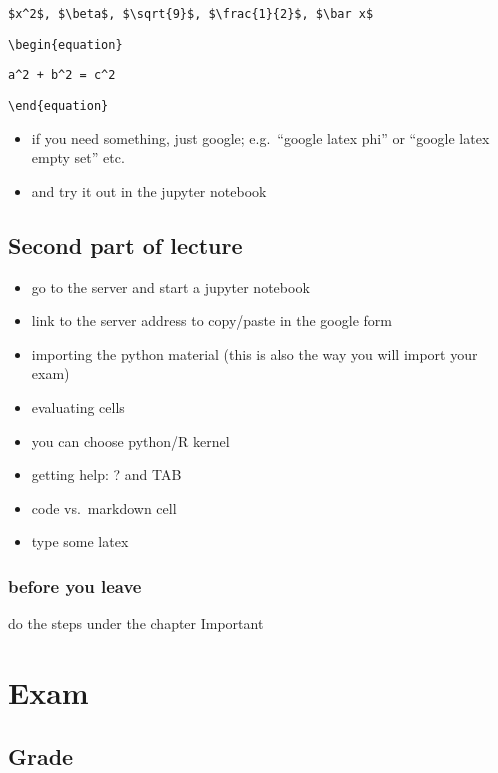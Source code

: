 \documentclass[]{book}
\providecommand{\tightlist}{%
  \setlength{\itemsep}{0pt}\setlength{\parskip}{0pt}}
\begin{document}
\texttt{\$x\^{}2\$,\ \$\textbackslash{}beta\$,\ \$\textbackslash{}sqrt\{9\}\$,\ \$\textbackslash{}frac\{1\}\{2\}\$,\ \$\textbackslash{}bar\ x\$}

\texttt{\textbackslash{}begin\{equation\}}

\texttt{a\^{}2\ +\ b\^{}2\ =\ c\^{}2}

\texttt{\textbackslash{}end\{equation\}}

\begin{itemize}
\tightlist
\item
  if you need something, just google; e.g.~``google latex phi'' or ``google latex empty set'' etc.
\item
  and try it out in the jupyter notebook
\end{itemize}

\hypertarget{second-part-of-lecture}{%
\section{Second part of lecture}\label{second-part-of-lecture}}

\begin{itemize}
\item
  go to the server and start a jupyter notebook
\item
  link to the server address to copy/paste in the google form
\item
  importing the python material (this is also the way you will import your exam)
\item
  evaluating cells
\item
  you can choose python/R kernel
\item
  getting help: ? and TAB
\item
  code vs.~markdown cell
\item
  type some latex
\end{itemize}

\hypertarget{before-you-leave}{%
\subsection{before you leave}\label{before-you-leave}}

do the steps under the chapter Important

\hypertarget{exam-1}{%
\chapter{Exam}\label{exam-1}}

\hypertarget{grade}{%
\section{Grade}\label{grade}}
\end{document}

